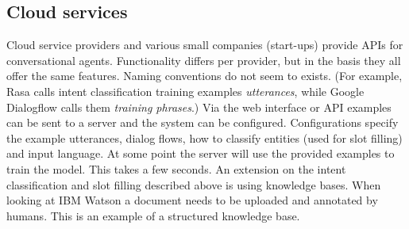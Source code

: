 \subsection{Cloud services}
\label{subsec:cloud_services}
Cloud service providers and various small companies (start-ups) provide APIs for conversational agents.
Functionality differs per provider, but in the basis they all offer the same features.
Naming conventions do not seem to exists.
(For example, Rasa calls intent classification training examples \textit{utterances}, while Google Dialogflow calls them \textit{training phrases}.)
Via the web interface or API examples can be sent to a server and the system can be configured.
Configurations specify the example utterances, dialog flows, how to classify entities (used for slot filling) and input language.
At some point the server will use the provided examples to train the model.
This takes a few seconds.
An extension on the intent classification and slot filling described above is using knowledge bases.
When looking at IBM Watson a document needs to be uploaded and annotated by humans.
This is an example of a structured knowledge base.


